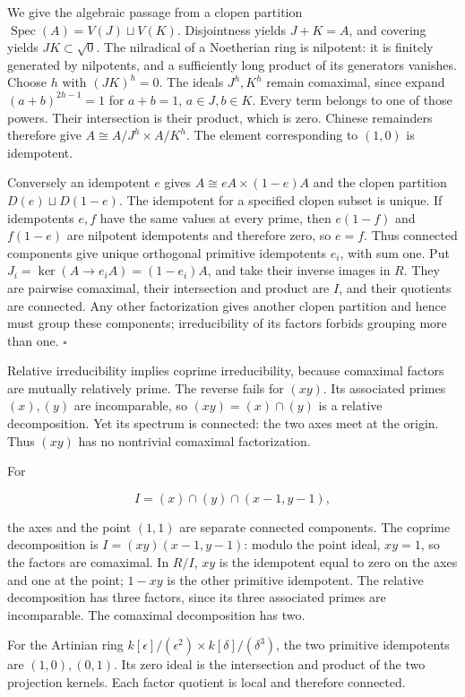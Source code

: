 \documentclass[
]{article}
\begin{document}
We give the algebraic passage from a clopen partition
\(\operatorname{Spec}(A)=V(J)\sqcup V(K)\). Disjointness yields
\(J+K=A\), and covering yields \(JK\subset\sqrt0\). The nilradical of a
Noetherian ring is nilpotent: it is finitely generated by nilpotents,
and a sufficiently long product of its generators vanishes. Choose \(h\)
with \((JK)^h=0\). The ideals \(J^h,K^h\) remain comaximal, since expand
\((a+b)^{2h-1}=1\) for \(a+b=1\), \(a\in J,b\in K\). Every term belongs
to one of those powers. Their intersection is their product, which is
zero. Chinese remainders therefore give \(A\cong A/J^h\times A/K^h\).
The element corresponding to \((1,0)\) is idempotent.

Conversely an idempotent \(e\) gives \(A\cong eA\times(1-e)A\) and the
clopen partition \(D(e)\sqcup D(1-e)\). The idempotent for a specified
clopen subset is unique. If idempotents \(e,f\) have the same values at
every prime, then \(e(1-f)\) and \(f(1-e)\) are nilpotent idempotents
and therefore zero, so \(e=f\). Thus connected components give unique
orthogonal primitive idempotents \(e_i\), with sum one. Put
\(J_i=\ker(A\to e_iA)=(1-e_i)A\), and take their inverse images in
\(R\). They are pairwise comaximal, their intersection and product are
\(I\), and their quotients are connected. Any other factorization gives
another clopen partition and hence must group these components;
irreducibility of its factors forbids grouping more than one.
\(\square\)

Relative irreducibility implies coprime irreducibility, because
comaximal factors are mutually relatively prime. The reverse fails for
\((xy)\). Its associated primes \((x),(y)\) are incomparable, so
\((xy)=(x)\cap(y)\) is a relative decomposition. Yet its spectrum is
connected: the two axes meet at the origin. Thus \((xy)\) has no
nontrivial comaximal factorization.

For

\[
I=(x)\cap(y)\cap(x-1,y-1),
\]

the axes and the point \((1,1)\) are separate connected components. The
coprime decomposition is \(I=(xy)(x-1,y-1)\): modulo the point ideal,
\(xy=1\), so the factors are comaximal. In \(R/I\), \(xy\) is the
idempotent equal to zero on the axes and one at the point; \(1-xy\) is
the other primitive idempotent. The relative decomposition has three
factors, since its three associated primes are incomparable. The
comaximal decomposition has two.

For the Artinian ring
\(k[\epsilon]/(\epsilon^2)\times k[\delta]/(\delta^3)\), the two
primitive idempotents are \((1,0),(0,1)\). Its zero ideal is the
intersection and product of the two projection kernels. Each factor
quotient is local and therefore connected.
\end{document}

